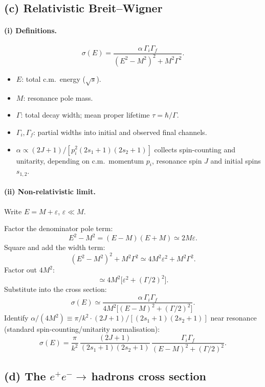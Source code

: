 \documentclass[11pt]{article}
\begin{document}
\subsection*{(c) Relativistic Breit--Wigner}

\paragraph{(i) Definitions.}
\[
\sigma(E)=\frac{\alpha\,\Gamma_i\Gamma_f}{(E^2-M^2)^2+M^2\Gamma^2}.
\]
\begin{itemize}
\item $E$: total c.m.\ energy ($\sqrt s$).
\item $M$: resonance pole mass.
\item $\Gamma$: total decay width; mean proper lifetime $\tau=\hbar/\Gamma$.
\item $\Gamma_i,\Gamma_f$: partial widths into initial and observed final channels.
\item $\alpha\propto (2J+1)/[p_i^2(2s_1+1)(2s_2+1)]$ collects spin-counting and unitarity, depending on c.m.\ momentum $p_i$, resonance spin $J$ and initial spins $s_{1,2}$.
\end{itemize}

\paragraph{(ii) Non-relativistic limit.} Write $E=M+\varepsilon$, $\varepsilon\ll M$.

Factor the denominator pole term:
\[
E^2-M^2=(E-M)(E+M)\simeq 2M\varepsilon.
\]
Square and add the width term:
\[
(E^2-M^2)^2+M^2\Gamma^2\simeq 4M^2\varepsilon^2+M^2\Gamma^2.
\]
Factor out $4M^2$:
\[
\simeq 4M^2\bigl[\varepsilon^2+(\Gamma/2)^2\bigr].
\]
Substitute into the cross section:
\[
\sigma(E)\simeq \frac{\alpha\,\Gamma_i\Gamma_f}{4 M^2\bigl[(E-M)^2+(\Gamma/2)^2\bigr]}.
\]
Identify $\alpha/(4M^2)\equiv \pi/k^2 \cdot (2J+1)/[(2s_1+1)(2s_2+1)]$ near resonance (standard spin-counting/unitarity normalisation):
\[
\boxed{\;\sigma(E)=\frac{\pi}{k^2}\,\frac{(2J+1)}{(2s_1+1)(2s_2+1)}\,\frac{\Gamma_i\Gamma_f}{(E-M)^2+(\Gamma/2)^2}.\;}
\]

\subsection*{(d) The $e^+e^-\to$\,hadrons cross section}
\end{document}
